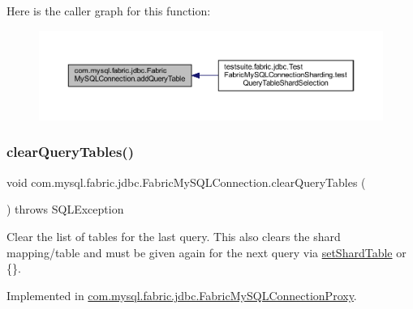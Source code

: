 Here is the caller graph for this function\+:\nopagebreak
\begin{figure}[H]
\begin{center}
\leavevmode
\includegraphics[width=350pt]{interfacecom_1_1mysql_1_1fabric_1_1jdbc_1_1_fabric_my_s_q_l_connection_a5e830f9ef0fa1d0bae2d5dab997629c3_icgraph}
\end{center}
\end{figure}
\mbox{\label{interfacecom_1_1mysql_1_1fabric_1_1jdbc_1_1_fabric_my_s_q_l_connection_a50d57924d9cec195770ff2621425e36e}} 
\subsubsection{\texorpdfstring{clear\+Query\+Tables()}{clearQueryTables()}}
{\footnotesize\ttfamily void com.\+mysql.\+fabric.\+jdbc.\+Fabric\+My\+S\+Q\+L\+Connection.\+clear\+Query\+Tables (\begin{DoxyParamCaption}{ }\end{DoxyParamCaption}) throws S\+Q\+L\+Exception}

Clear the list of tables for the last query. This also clears the shard mapping/table and must be given again for the next query via \mbox{\hyperlink{interfacecom_1_1mysql_1_1fabric_1_1jdbc_1_1_fabric_my_s_q_l_connection_a5e9287d2536bd36fcc2f63d8a27a6b9b}{set\+Shard\+Table}} or \{\}. 

Implemented in \mbox{\hyperlink{classcom_1_1mysql_1_1fabric_1_1jdbc_1_1_fabric_my_s_q_l_connection_proxy_a797863b7d0a0798ce065d21b06a9f76d}{com.\+mysql.\+fabric.\+jdbc.\+Fabric\+My\+S\+Q\+L\+Connection\+Proxy}}.


